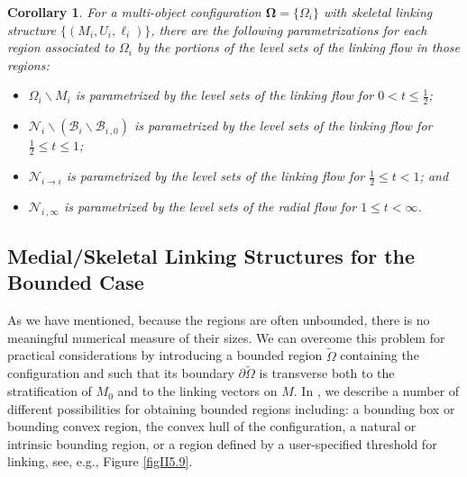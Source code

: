 \documentclass[10pt]{amsart}
\newtheorem{Corollary}[Thm]{Corollary}
\theoremstyle{definition}
\theoremstyle{definition}
\numberwithin{equation}{section}
\def \bgW {\boldsymbol \Omega}
\def \cB {\mathcal{B}}
\def \cN {\mathcal{N}}
\def \gW {\Omega}
\begin{document}
\begin{Corollary}
\label{CorII4.1}
For a multi-object configuration $\bgW = \{ \gW_i\}$ with skeletal 
linking structure $\{(M_i, U_i, \ell_i)\}$, there are the following 
parametrizations for each region associated to $\gW_i$ by the portions of 
the level sets of the linking flow in those regions:
\begin{itemize}
\item[1)]  $\gW_i \backslash M_i$ is parametrized by the level sets of the 
linking flow for $0 < t \leq \frac{1}{2}$;
\item[2)] $\cN_i \backslash (\cB_i \backslash \cB_{i\, ,0})$ is 
parametrized by the level sets of the linking flow for $\frac{1}{2} \leq t 
\leq 1$;
\item[3)] $\cN_{i \to i}$ is parametrized by the level sets of the linking 
flow for $\frac{1}{2} \leq t < 1$; and 
\item[4)] $\cN_{i\, ,\infty}$ is  parametrized by the level sets of the 
radial flow for $1 \leq t < \infty$.
\end{itemize}
\end{Corollary}


\subsection*{Medial/Skeletal Linking Structures for the Bounded Case}
 \par
As we have mentioned, because the regions are often unbounded, there is 
no meaningful numerical measure of their sizes.  We can overcome this 
problem for practical considerations by introducing a bounded region 
$\tilde \gW$ containing the configuration and such that its 
boundary $\partial \tilde \gW$ is transverse both to the 
stratification of $M_0$ and to the linking vectors on $M$.  In \cite{DG1}, 
we describe a number of different possibilities for obtaining bounded 
regions including: a bounding box or bounding 
convex region, the convex hull of the configuration, a natural or intrinsic 
bounding region, or a region defined by a user-specified threshold for 
linking, see, e.g., Figure \ref{figII5.9}.  
\end{document}
